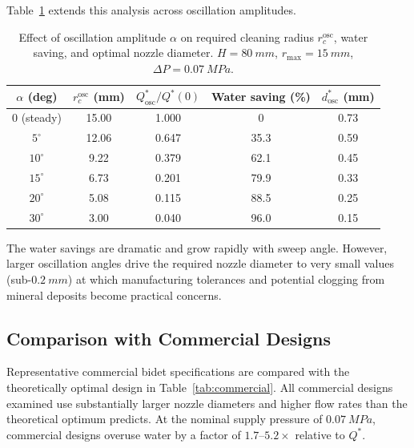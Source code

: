 \documentclass[aps,prfluids,reprint,amsmath,amssymb,floatfix]{revtex4-2}
\begin{document}
Table~\ref{tab:osc} extends this analysis across oscillation amplitudes.

\begin{table}[H]
\centering
\caption{Effect of oscillation amplitude $\alpha$ on required cleaning
radius $r_c^\mathrm{osc}$, water saving, and optimal nozzle diameter.
$H = \SI{80}{mm}$, $r_\mathrm{max} = \SI{15}{mm}$, $\Delta P = \SI{0.07}{MPa}$.}
\label{tab:osc}
\renewcommand{\arraystretch}{1.3}
\begin{tabular}{ccccc}
\toprule
$\alpha$ (deg) & $r_c^\mathrm{osc}$ (mm) & $Q_\mathrm{osc}^*/Q^*(0)$
  & Water saving (\%) & $d_\mathrm{osc}^*$ (mm) \\
\midrule
$0$   (steady) & 15.00 & 1.000 & 0    & 0.73 \\
$5^\circ$      & 12.06 & 0.647 & 35.3 & 0.59 \\
$10^\circ$     &  9.22 & 0.379 & 62.1 & 0.45 \\
$15^\circ$     &  6.73 & 0.201 & 79.9 & 0.33 \\
$20^\circ$     &  5.08 & 0.115 & 88.5 & 0.25 \\
$30^\circ$     &  3.00 & 0.040 & 96.0 & 0.15 \\
\bottomrule
\end{tabular}
\end{table}

The water savings are dramatic and grow rapidly with sweep angle. However,
larger oscillation angles drive the required nozzle diameter to very small
values (sub-$\SI{0.2}{mm}$) at which manufacturing tolerances and potential
clogging from mineral deposits become practical concerns.

\subsection{Comparison with Commercial Designs}
\label{subsec:commercial}

Representative commercial bidet specifications are compared with the
theoretically optimal design in Table~\ref{tab:commercial}. All commercial
designs examined use substantially larger nozzle diameters and higher
flow rates than the theoretical optimum predicts. At the nominal supply
pressure of $\SI{0.07}{MPa}$, commercial designs overuse water by a factor
of $1.7$--$5.2\times$ relative to $Q^*$.
\end{document}
